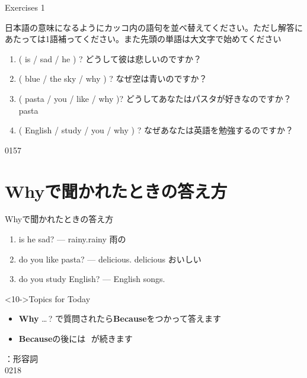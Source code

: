 \documentclass[aspectratio=169,xcolor={dvipsnames,table}]{beamer}
\begin{document}
\begin{frame}[plain]{Exercises 1}

{\small 日本語の意味になるようにカッコ内の語句を並べ替えてください。ただし解答にあたっては1語補ってください。また先頭の単語は大文字で始めてください}
 \begin{enumerate}
  \item ( is / sad / he ) ? どうして彼は悲しいのですか？\\
  \item ( blue / the sky / why ) ? なぜ空は青いのですか？\\
  \item ( pasta / you / like / why )? どうしてあなたはパスタが好きなのですか？\\
\hfill{\scriptsize pasta }
  \item ( English / study / you / why ) ? なぜあなたは英語を勉強するのですか？\\
 \end{enumerate}

\hfill{\tiny 0157}\,{\scriptsize {}}
\end{frame}
\section{Whyで聞かれたときの答え方}
\begin{frame}[plain]{Whyで聞かれたときの答え方}
 \begin{enumerate}
  \item<1->  is he sad? ---   rainy.\hfill{\scriptsize rainy   雨の}
  \item<4->  do you like pasta? ---   delicious.%
\hfill{\scriptsize delicious   おいしい}
  \item<7->  do you study English? ---   English songs.
 \end{enumerate}

\bigskip

\begin{block}<10->{Topics for Today}
\begin{itemize}[square]\small
 \item {\bfseries Why} \ldots\,?\,\,で質問されたら{\bfseries Because}をつかって答えます\hfill{\small {}}
 \item {\bfseries Because}の後には\,\,\,\,が続きます
\end{itemize}
     \end{block}

\hfill{\scriptsize {}：形容詞}\\
\hfill{\tiny 0218}\,{\scriptsize {}}
\end{frame}
\end{document}
